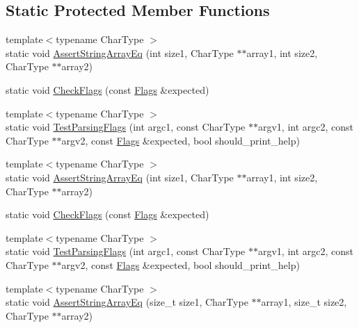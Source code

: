 \subsection*{Static Protected Member Functions}
\begin{DoxyCompactItemize}
\item 
{\footnotesize template$<$typename Char\+Type $>$ }\\static void \mbox{\hyperlink{classtesting_1_1_parse_flags_test_ab6e898999669ae38441ed822356a2812}{Assert\+String\+Array\+Eq}} (int size1, Char\+Type $\ast$$\ast$array1, int size2, Char\+Type $\ast$$\ast$array2)
\item 
static void \mbox{\hyperlink{classtesting_1_1_parse_flags_test_a5919553c35ebe3910fcff51cc0b59fd6}{Check\+Flags}} (const \mbox{\hyperlink{structtesting_1_1_flags}{Flags}} \&expected)
\item 
{\footnotesize template$<$typename Char\+Type $>$ }\\static void \mbox{\hyperlink{classtesting_1_1_parse_flags_test_ad769e5f5a71939c3a9ad853b415fa9d2}{Test\+Parsing\+Flags}} (int argc1, const Char\+Type $\ast$$\ast$argv1, int argc2, const Char\+Type $\ast$$\ast$argv2, const \mbox{\hyperlink{structtesting_1_1_flags}{Flags}} \&expected, bool should\+\_\+print\+\_\+help)
\item 
{\footnotesize template$<$typename Char\+Type $>$ }\\static void \mbox{\hyperlink{classtesting_1_1_parse_flags_test_ab6e898999669ae38441ed822356a2812}{Assert\+String\+Array\+Eq}} (int size1, Char\+Type $\ast$$\ast$array1, int size2, Char\+Type $\ast$$\ast$array2)
\item 
static void \mbox{\hyperlink{classtesting_1_1_parse_flags_test_a5919553c35ebe3910fcff51cc0b59fd6}{Check\+Flags}} (const \mbox{\hyperlink{structtesting_1_1_flags}{Flags}} \&expected)
\item 
{\footnotesize template$<$typename Char\+Type $>$ }\\static void \mbox{\hyperlink{classtesting_1_1_parse_flags_test_ad769e5f5a71939c3a9ad853b415fa9d2}{Test\+Parsing\+Flags}} (int argc1, const Char\+Type $\ast$$\ast$argv1, int argc2, const Char\+Type $\ast$$\ast$argv2, const \mbox{\hyperlink{structtesting_1_1_flags}{Flags}} \&expected, bool should\+\_\+print\+\_\+help)
\item 
{\footnotesize template$<$typename Char\+Type $>$ }\\static void \mbox{\hyperlink{classtesting_1_1_parse_flags_test_a5d93780e65e1aa304334a8d4372c51fc}{Assert\+String\+Array\+Eq}} (size\+\_\+t size1, Char\+Type $\ast$$\ast$array1, size\+\_\+t size2, Char\+Type $\ast$$\ast$array2)

\end{DoxyCompactItemize}
